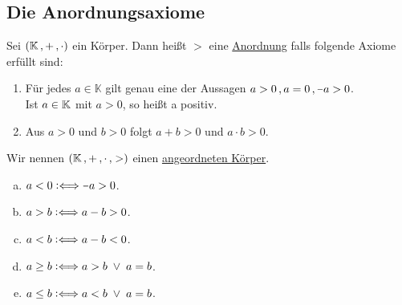 \documentclass[../ana1.tex]{subfiles}
\begin{document}
\subsection{Die Anordnungsaxiome}
\setcounter{satz}{-1} %

\begin{defi}
	Sei \((\mathbb{K} \operatorname{,} + \operatorname{,} \cdot) \) ein Körper.
	Dann heißt \(> \) eine \underline{Anordnung} falls folgende Axiome erfüllt sind:
	\begin{enumerate}[label= (A\arabic*)]
		\item\label{ax:A1}Für jedes \(a \in \mathbb{K} \) gilt genau eine der Aussagen \(a > 0 \ko a = 0 \ko \minus a > 0 \). \\
		      Ist \(a \in \mathbb{K} \) mit \(a > 0 \), so heißt a positiv.
		\item\label{ax:A2}Aus \(a>0 \) und \(b>0 \) folgt \(a + b > 0 \) und \(a \cdot b > 0 \).
	\end{enumerate}
	Wir nennen \((\mathbb{K} \operatorname{,} + \operatorname{,} \cdot \operatorname{,} >) \) einen \underline{angeordneten Körper}.
\end{defi}

\begin{notation}\leavevmode
	\begin{enumerate}[(a)]
		\item \(a < 0 \longeq \minus a > 0 \).
		\item \(a > b \mathrel{\vcentcolon\Longleftrightarrow} a - b > 0 \). \qquad \qquad \quad {}
		\item \(a < b \mathrel{\vcentcolon\Longleftrightarrow} a - b < 0 \).
		\item \(a \geq b \mathrel{\vcentcolon\Longleftrightarrow} a > b  \; \vee  \;  a = b \).
		\item \(a \leq b \mathrel{\vcentcolon\Longleftrightarrow} a < b  \; \vee  \;  a = b \).
	\end{enumerate}
\end{notation}
\end{document}
